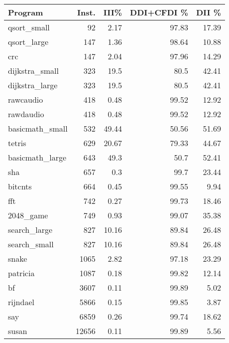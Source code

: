 \begin{tabular}{l|r|r|r|r}
\hline
 Program         &   Inst. &   III\% &   DDI+CFDI \% &   DII \% \\
\hline
 qsort\_small     &      92 &   2.17 &        97.83 &   17.39 \\
 \hline
 qsort\_large     &     147 &   1.36 &        98.64 &   10.88 \\
 \hline
 crc             &     147 &   2.04 &        97.96 &   14.29 \\
 \hline
 dijkstra\_small  &     323 &  19.5  &        80.5  &   42.41 \\
 \hline
 dijkstra\_large  &     323 &  19.5  &        80.5  &   42.41 \\
 \hline
 rawcaudio       &     418 &   0.48 &        99.52 &   12.92 \\
 \hline
 rawdaudio       &     418 &   0.48 &        99.52 &   12.92 \\
 \hline
 basicmath\_small &     532 &  49.44 &        50.56 &   51.69 \\
 \hline
 tetris          &     629 &  20.67 &        79.33 &   44.67 \\
 \hline
 basicmath\_large &     643 &  49.3  &        50.7  &   52.41 \\
 \hline
 sha             &     657 &   0.3  &        99.7  &   23.44 \\
 \hline
 bitcnts         &     664 &   0.45 &        99.55 &    9.94 \\
 \hline
 fft             &     742 &   0.27 &        99.73 &   18.46 \\
 \hline
 2048\_game       &     749 &   0.93 &        99.07 &   35.38 \\
 \hline
 search\_large    &     827 &  10.16 &        89.84 &   26.48 \\
 \hline
 search\_small    &     827 &  10.16 &        89.84 &   26.48 \\
 \hline
 snake           &    1065 &   2.82 &        97.18 &   23.29 \\
 \hline
 patricia        &    1087 &   0.18 &        99.82 &   12.14 \\
 \hline
 bf              &    3607 &   0.11 &        99.89 &    5.02 \\
 \hline
 rijndael        &    5866 &   0.15 &        99.85 &    3.87 \\
 \hline
 say             &    6859 &   0.26 &        99.74 &   18.62 \\
 \hline
 susan           &   12656 &   0.11 &        99.89 &    5.56 \\

\end{tabular}
